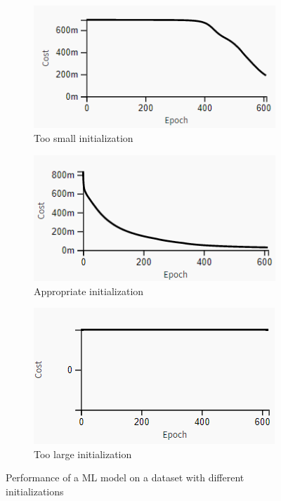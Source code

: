 \begin{figure}{}
	\centering
	
	\begin{subfigure}[b]{.30\linewidth}{}
		\includegraphics[keepaspectratio = True, scale = 0.40]{figures/small.png}
		\centering
		\caption{Too small initialization}
		\vspace{2.0em}
		\label{fig:sml}
	\end{subfigure}
	\begin{subfigure}[b]{.30\linewidth}
		\includegraphics[keepaspectratio = True, scale = 0.40]{figures/apr.png}
		\caption{Appropriate initialization}
		\vspace{2.0em}
		\label{fig:apr}
	\end{subfigure}
	\begin{subfigure}[b]{.30\linewidth}
		\includegraphics[keepaspectratio = True, scale = 0.40]{figures/lrg.png}
		\caption{Too large initialization}
		\vspace{2.0em}
		\label{fig:lrg}
	\end{subfigure}
	
	
	\caption{Performance of a ML model on a dataset with different initializations}
	\label{fig:results}
\end{figure}

